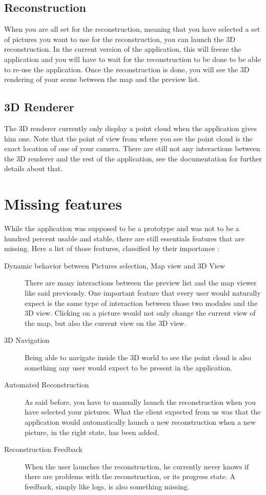 \subsection*{Reconstruction}
When you are all set for the reconstruction, meaning that you have selected a set of pictures you want to use for the reconstruction, you can launch the 3D reconstruction. In the current version of the application,
this will freeze the application and you will have to wait for the reconstruction to be done to be able to re-use the application. Once the reconstruction is done, you will see the 3D rendering of your scene between the map
and the preview list.

\subsection*{3D Renderer}
The 3D renderer currently only display a point cloud when the application gives him one. Note that the point of view from where you see the point cloud is the exact location of one of your camera. There 
are still not any interactions between the 3D renderer and the rest of the application, see the documentation for further details about that.

\section{Missing features}
While the application was supposed to be a prototype and was not to be a hundred percent usable and stable, there are still essentials features that are missing. Here a list of those features, classified by their importance :
\begin{description}
\item[Dynamic behavior between Pictures selection, Map view and 3D View] There are many interactions between the preview list and the map viewer like said previously. One important feature that every user would naturally
expect is the same type of interaction between those two modules and the 3D view. Clicking on a picture would not only change the current view of the map, but also the current view on the 3D view.
\item[3D Navigation] Being able to navigate inside the 3D world to see the point cloud is also something any user would expect to be present in the application. 
\item[Automated Reconstruction] As said before, you have to manually launch the reconstruction when you have selected your pictures. What the client expected from us was that the application would automatically launch
a new reconstruction when a new picture, in the right state, has been added. 
\item[Reconstruction Feedback] When the user launches the reconstruction, he currently never knows if there are problems with the reconstruction, or its progress state. A feedback, simply like logs, is also something missing.
\end{description}

